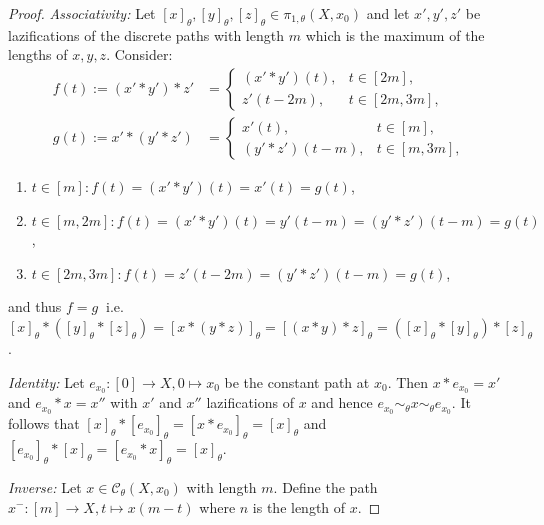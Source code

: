 \documentclass[a4paper, 11pt, twoside]{article}
\theoremstyle{break}
\theoremstyle{break}
\begin{document}
\begin{proof}
  \textit{Associativity:}
    Let $[x]_{\theta}, [y]_{\theta}, [z]_{\theta} \in \pi_{1,\theta}(X, x_0)$ 
    and let $x', y', z'$ be lazifications of the discrete paths with length $m$ which is the maximum of the lengths of $x,y,z$. Consider:
    \begin{align*}
      f(t) := (x' * y') * z' &= \begin{cases}
        (x' * y')(t), &t \in [2m], \\
        z'(t - 2m), &t \in [2m, 3m],
      \end{cases}\\
      g(t) := x' * (y' * z') &= \begin{cases}
        x'(t), &t \in [m], \\
        (y' * z')(t - m), &t \in [m, 3m],
      \end{cases}
    \end{align*}
  \begin{enumerate}
    \item $t \in [m]\colon f(t) = (x' * y')(t) = x'(t) = g(t)$,
    \item $t \in [m,2m]\colon f(t) = (x' * y')(t) = y'(t - m) = (y' * z')(t - m) = g(t)$,
    \item $t \in [2m,3m]\colon f(t) = z'(t - 2m) = (y' * z')(t - m) = g(t)$,
  \end{enumerate}
  and thus $f = g\:$ i.e. $[x]_{\theta} * ([y]_{\theta} * [z]_{\theta}) = [x * (y * z)]_{\theta} = [(x * y) * z]_{\theta} = ([x]_{\theta} * [y]_{\theta}) * [z]_{\theta}$.
  
  \textit{Identity:}
  Let $e_{x_0}\colon [0] \to X, 0 \mapsto x_0$ be the constant path at $x_0$. Then $x * e_{x_0} = x'$ and $e_{x_0} * x = x''$ with $x'$ and $x''$ lazifications of $x$ 
  and hence $e_{x_0} \sim_{\theta} x \sim_{\theta} e_{x_0}$.
  It follows that $[x]_{\theta} * [e_{x_0}]_{\theta} = [x * e_{x_0}]_{\theta} = [x]_{\theta}$ and $[e_{x_0}]_{\theta} * [x]_{\theta} = [e_{x_0} * x]_{\theta} = [x]_{\theta}$.
  
  \textit{Inverse:}
  Let $x \in \mathcal{C}_{\theta}(X, x_0)$ with length $m$. Define the path $x^-\colon [m] \to X, t \mapsto x(m - t)$ where $n$ is the length of $x$.


\end{proof}
\end{document}
